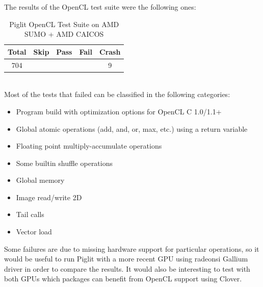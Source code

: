 \documentclass[12pt,a4paper,oneside]{article}
\begin{document}
The results of the OpenCL test suite were the following ones:
\begin{table}[h!]
  \begin{center}
    \caption{Piglit OpenCL Test Suite on AMD SUMO + AMD CAICOS}
    \label{tab:piglit_opencl}
    \begin{tabular}{c|c|c|c|c}
    Total & Skip & Pass & Fail & Crash \\
    \hline
    704 & \color{blue}{94} & \color{green}{541} & \color{red}{60} & 9
    \end{tabular}
  \end{center}
\end{table}\\
Most of the tests that failed can be classified in the following categories:
\begin{itemize}
  \item Program build with optimization options for OpenCL C 1.0/1.1+
  \item Global atomic operations (add, and, or, max, etc.) using a return variable
  \item Floating point multiply-accumulate operations
  \item Some builtin shuffle operations
  \item Global memory
  \item Image read/write 2D
  \item Tail calls
  \item Vector load
\end{itemize}
Some failures are due to missing hardware support for particular operations, so
it would be useful to run Piglit with a more recent GPU using radeonsi Gallium
driver in order to compare the results. It would also be interesting to test
with both GPUs which packages can benefit from OpenCL support using Clover.
\end{document}
